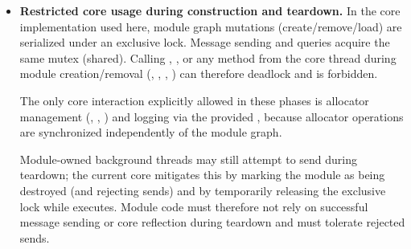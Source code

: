 \begin{itemize}
    \item \textbf{Restricted core usage during construction and teardown.}
    In the core implementation used here, module graph mutations (create/remove/load) are serialized under an exclusive  lock.
    Message sending and  queries acquire the same mutex (shared). Calling , ,  or any  method from the core thread during module creation/removal (, , , ) can therefore deadlock and is forbidden.

    The only core interaction explicitly allowed in these phases is allocator management
    (, , ) and logging via the provided ,
    because allocator operations are synchronized independently of the module graph.

    Module-owned background threads may still attempt to send during teardown; the current core mitigates this by marking the module as being destroyed
    (and rejecting sends) and by temporarily releasing the exclusive lock while  executes.
    Module code must therefore not rely on successful message sending or core reflection during teardown and must tolerate rejected sends.



\end{itemize}
